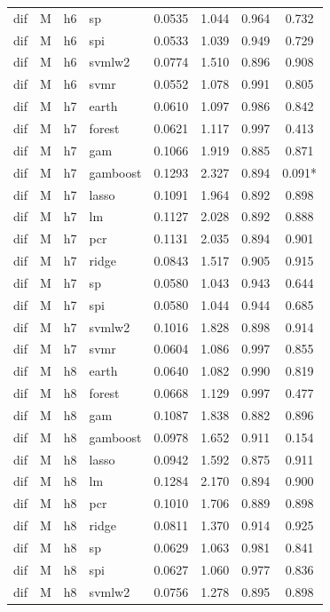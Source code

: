 \begin{ThreePartTable}
\begin{longtable}[t]{llclcccc}
dif & M & h6 & sp & 0.0535 & 1.044 & 0.964 & 0.732\\
dif & M & h6 & spi & 0.0533 & 1.039 & 0.949 & 0.729\\
dif & M & h6 & svmlw2 & 0.0774 & 1.510 & 0.896 & 0.908\\
dif & M & h6 & svmr & 0.0552 & 1.078 & 0.991 & 0.805\\
\addlinespace
dif & M & h7 & earth & 0.0610 & 1.097 & 0.986 & 0.842\\
dif & M & h7 & forest & 0.0621 & 1.117 & 0.997 & 0.413\\
dif & M & h7 & gam & 0.1066 & 1.919 & 0.885 & 0.871\\
dif & M & h7 & gamboost & 0.1293 & 2.327 & 0.894 & 0.091*\\
dif & M & h7 & lasso & 0.1091 & 1.964 & 0.892 & 0.898\\
dif & M & h7 & lm & 0.1127 & 2.028 & 0.892 & 0.888\\
dif & M & h7 & pcr & 0.1131 & 2.035 & 0.894 & 0.901\\
dif & M & h7 & ridge & 0.0843 & 1.517 & 0.905 & 0.915\\
dif & M & h7 & sp & 0.0580 & 1.043 & 0.943 & 0.644\\
dif & M & h7 & spi & 0.0580 & 1.044 & 0.944 & 0.685\\
dif & M & h7 & svmlw2 & 0.1016 & 1.828 & 0.898 & 0.914\\
dif & M & h7 & svmr & 0.0604 & 1.086 & 0.997 & 0.855\\
\addlinespace
dif & M & h8 & earth & 0.0640 & 1.082 & 0.990 & 0.819\\
dif & M & h8 & forest & 0.0668 & 1.129 & 0.997 & 0.477\\
dif & M & h8 & gam & 0.1087 & 1.838 & 0.882 & 0.896\\
dif & M & h8 & gamboost & 0.0978 & 1.652 & 0.911 & 0.154\\
dif & M & h8 & lasso & 0.0942 & 1.592 & 0.875 & 0.911\\
dif & M & h8 & lm & 0.1284 & 2.170 & 0.894 & 0.900\\
dif & M & h8 & pcr & 0.1010 & 1.706 & 0.889 & 0.898\\
dif & M & h8 & ridge & 0.0811 & 1.370 & 0.914 & 0.925\\
dif & M & h8 & sp & 0.0629 & 1.063 & 0.981 & 0.841\\
dif & M & h8 & spi & 0.0627 & 1.060 & 0.977 & 0.836\\
dif & M & h8 & svmlw2 & 0.0756 & 1.278 & 0.895 & 0.898\\

\end{longtable}
\end{ThreePartTable}
